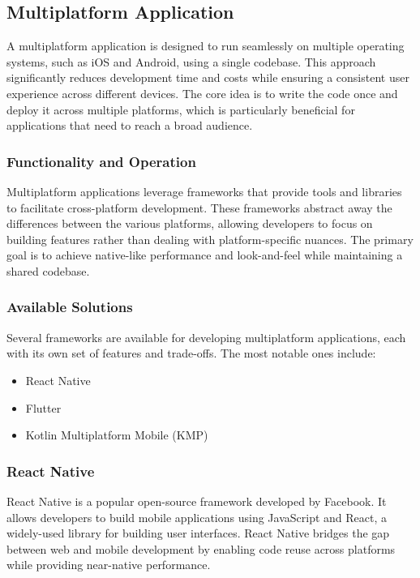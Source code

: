 \subsection{Multiplatform Application}\label{sec:multiplatform-application}

A multiplatform application is designed to run seamlessly on multiple operating systems, such as iOS and Android, using a single codebase. This approach significantly reduces development time and costs while ensuring a consistent user experience across different devices. The core idea is to write the code once and deploy it across multiple platforms, which is particularly beneficial for applications that need to reach a broad audience.

\subsubsection{Functionality and Operation}

Multiplatform applications leverage frameworks that provide tools and libraries to facilitate cross-platform development. These frameworks abstract away the differences between the various platforms, allowing developers to focus on building features rather than dealing with platform-specific nuances. The primary goal is to achieve native-like performance and look-and-feel while maintaining a shared codebase.

\subsubsection{Available Solutions}

Several frameworks are available for developing multiplatform applications, each with its own set of features and trade-offs. The most notable ones include:

\begin{itemize}
    \item React Native\cite{ReactNativeBook}
    \item Flutter\cite{Flutter}
    \item Kotlin Multiplatform Mobile (KMP)\cite{KMP}
\end{itemize}

\subsubsection{React Native}

React Native is a popular open-source framework developed by Facebook. It allows developers to build mobile applications using JavaScript and React, a widely-used library for building user interfaces. React Native bridges the gap between web and mobile development by enabling code reuse across platforms while providing near-native performance\cite{ReactNativeBook}.

